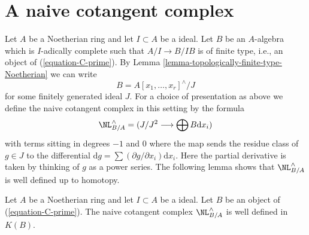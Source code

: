 \section{A naive cotangent complex}
\label{section-naive-cotangent-complex}

\noindent
Let $A$ be a Noetherian ring and let $I \subset A$ be a ideal.
Let $B$ be an $A$-algebra which is $I$-adically complete such
that $A/I \to B/IB$ is of finite type, i.e., an object of
(\ref{equation-C-prime}).
By Lemma \ref{lemma-topologically-finite-type-Noetherian} we can write
$$
B = A[x_1, \ldots, x_r]^\wedge / J
$$
for some finitely generated ideal $J$. For a choice of presentation as
above we define the naive cotangent complex in this setting by the formula
\begin{equation}
\label{equation-NL}
\NL^\wedge_{B/A} = (J/J^2 \longrightarrow \bigoplus B\text{d}x_i)
\end{equation}
with terms sitting in degrees $-1$ and $0$
where the map sends the residue class of $g \in J$ to the differential
$\text{d}g = \sum (\partial g/\partial x_i) \text{d}x_i$. Here
the partial derivative is taken by thinking of $g$ as a power series.
The following lemma shows that $\NL^\wedge_{B/A}$ is well defined
up to homotopy.

\begin{lemma}
\label{lemma-NL-up-to-homotopy}
Let $A$ be a Noetherian ring and let $I \subset A$ be a ideal.
Let $B$ be an object of (\ref{equation-C-prime}). The naive
cotangent complex $\NL^\wedge_{B/A}$ is well defined in $K(B)$.
\end{lemma}

